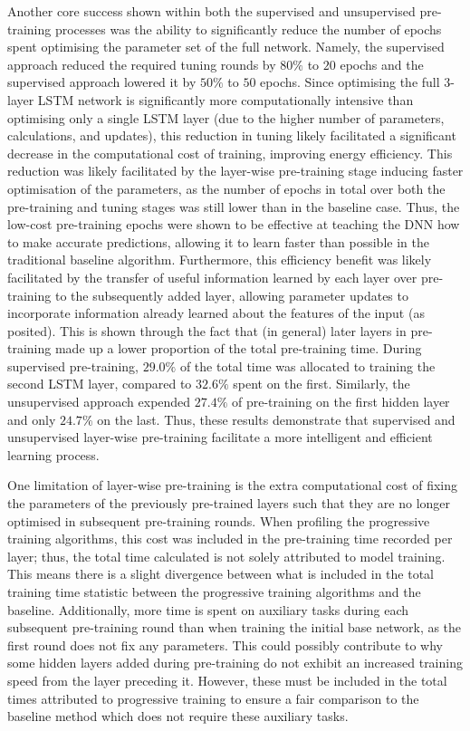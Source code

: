 \documentclass[a4paper, 11pt]{report}
\begin{document}
    Another core success shown within both the supervised and unsupervised pre-training processes was the ability to significantly reduce the number of epochs spent optimising the parameter set of the full network. Namely, the supervised approach reduced the required tuning rounds by $80\%$ to $20$ epochs and the supervised approach lowered it by $50\%$ to $50$ epochs. Since optimising the full 3-layer LSTM network is significantly more computationally intensive than optimising only a single LSTM layer (due to the higher number of parameters, calculations, and updates), this reduction in tuning likely facilitated a significant decrease in the computational cost of training, improving energy efficiency. This reduction was likely facilitated by the layer-wise pre-training stage inducing faster optimisation of the parameters, as the number of epochs in total over both the pre-training and tuning stages was still lower than in the baseline case. Thus, the low-cost pre-training epochs were shown to be effective at teaching the DNN how to make accurate predictions, allowing it to learn faster than possible in the traditional baseline algorithm. Furthermore, this efficiency benefit was likely facilitated by the transfer of useful information learned by each layer over pre-training to the subsequently added layer, allowing parameter updates to incorporate information already learned about the features of the input (as \citet{xu-2021} posited). This is shown through the fact that (in general) later layers in pre-training made up a lower proportion of the total pre-training time. During supervised pre-training, $29.0\%$ of the total time was allocated to training the second LSTM layer, compared to $32.6\%$ spent on the first. Similarly, the unsupervised approach expended $27.4\%$ of pre-training on the first hidden layer and only $24.7\%$ on the last. Thus, these results demonstrate that supervised and unsupervised layer-wise pre-training facilitate a more intelligent and efficient learning process. 

    One limitation of layer-wise pre-training is the extra computational cost of fixing the parameters of the previously pre-trained layers such that they are no longer optimised in subsequent pre-training rounds. When profiling the progressive training algorithms, this cost was included in the pre-training time recorded per layer; thus, the total time calculated is not solely attributed to model training. This means there is a slight divergence between what is included in the total training time statistic between the progressive training algorithms and the baseline. Additionally, more time is spent on auxiliary tasks during each subsequent pre-training round than when training the initial base network, as the first round does not fix any parameters. This could possibly contribute to why some hidden layers added during pre-training do not exhibit an increased training speed from the layer preceding it. However, these must be included in the total times attributed to progressive training to ensure a fair comparison to the baseline method which does not require these auxiliary tasks.
\end{document}
